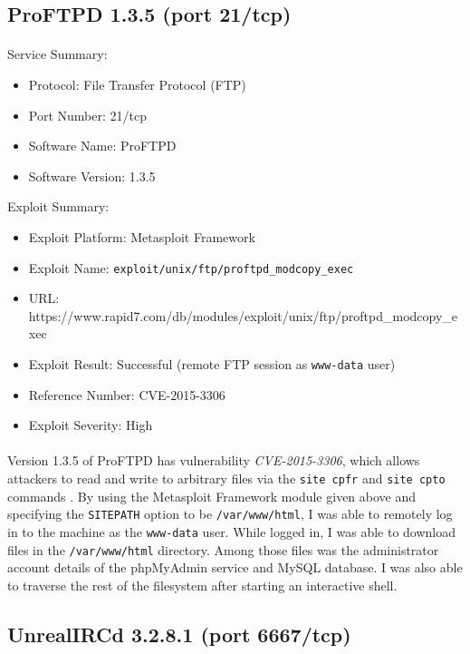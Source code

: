 \documentclass{article}
\begin{document}
\subsection{ProFTPD 1.3.5 (port 21/tcp)}
\label{subsec:pro_ftpd}
\paragraph{}
Service Summary:
\begin{itemize}
	\item Protocol: File Transfer Protocol (FTP)
	\item Port Number: 21/tcp
	\item Software Name: ProFTPD
	\item Software Version: 1.3.5
\end{itemize}
Exploit Summary:
\begin{itemize}
	\item Exploit Platform: Metasploit Framework
	\item Exploit Name: \texttt{exploit/unix/ftp/proftpd\_modcopy\_exec}
	\item URL: https://www.rapid7.com/db/modules/exploit/unix/ftp/proftpd\_modcopy\_exec
	\item Exploit Result: Successful (remote FTP session as \texttt{www-data} user)
	\item Reference Number: CVE-2015-3306
	\item Exploit Severity: High
\end{itemize}

\paragraph{}
Version 1.3.5 of ProFTPD has vulnerability \emph{CVE-2015-3306}, which allows attackers to read and write to arbitrary files via the \texttt{site cpfr} and \texttt{site cpto} commands \parencite{mitre20153306}.
By using the Metasploit Framework module given above and specifying the \texttt{SITEPATH} option to be \texttt{/var/www/html}, I was able to remotely log in to the machine as the \texttt{www-data} user.
While logged in, I was able to download files in the \texttt{/var/www/html} directory.
Among those files was the administrator account details of the phpMyAdmin service and MySQL database.
I was also able to traverse the rest of the filesystem after starting an interactive shell.

\subsection{UnrealIRCd 3.2.8.1 (port 6667/tcp)}
\label{subsec:unreal_ircd}
\end{document}
